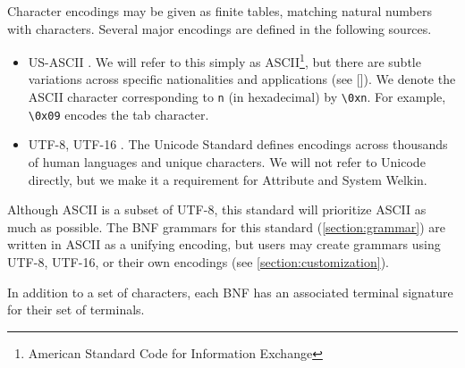Character encodings may be given as finite tables, matching natural numbers with characters. Several major encodings are defined in the following sources.
\begin{itemize}
	\item US-ASCII \citep{ascii}.
        We will refer to this simply as ASCII\footnote{American Standard Code for Information Exchange}, but there are subtle variations across specific nationalities and applications (see []). We denote the ASCII character corresponding to \texttt{n} (in hexadecimal) by \texttt{\textbackslash0xn}. For example, \texttt{\textbackslash0x09} encodes the tab character.
	\item UTF-8, UTF-16 \cite{unicode}. The Unicode Standard defines encodings across thousands of human languages and unique characters. We will not refer to Unicode directly, but we make it a requirement for Attribute and System Welkin.
\end{itemize}
\label{examples:encodings}


Although ASCII is a subset of UTF-8, this standard will prioritize ASCII as much as possible. The BNF grammars for this standard (\ref{section:grammar}) are written in ASCII as a unifying encoding, but users may create grammars using UTF-8, UTF-16, or their own encodings (see \ref{section:customization}).

In addition to a set of characters, each BNF has an associated terminal signature for their set of terminals.

